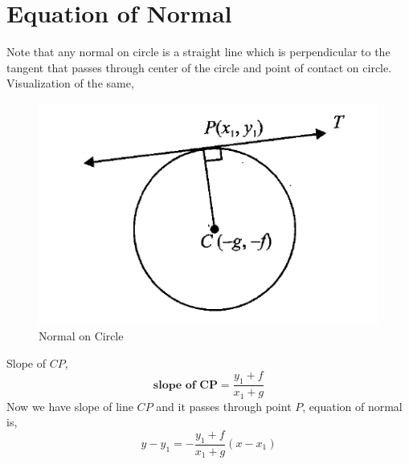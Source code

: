 \documentclass{article}
\begin{document}
\section{Equation of Normal}
Note that any normal on circle is a straight line which is perpendicular to the tangent that passes through center of the circle and point of contact on circle. Visualization of the same,
\begin{figure}[H]
    \centering
    \includegraphics[scale=0.5]{normal_of_circle.png}
    \caption{Normal on Circle}
\end{figure}
Slope of $CP$,
\begin{equation*}
    \textbf{slope of CP} = \frac{y_1+f}{x_1+g}
\end{equation*}
Now we have slope of line $CP$ and it passes through point $P$, equation of normal is,
\begin{equation*}
    y-y_1=-\frac{y_1+f}{x_1+g}(x-x_1)
\end{equation*}
\end{document}
